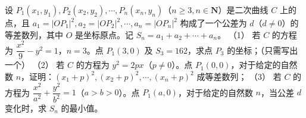 \begin{question}
设 $P_1(x_1, y_1), P_2(x_2, y_2), \cdots, P_n(x_n, y_n)$（$n \geqslant 3, n \in \mathbf{N}$）是二次曲线 $C$ 上的点，且 $a_1 = |OP_1|^2, a_2 = |OP_2|^2, \cdots, a_n = |OP_n|^2$ 构成了一个公差为 $d$（$d \ne 0$）的等差数列，其中 $O$ 是坐标原点。记 $S_n = a_1 + a_2 + \cdots + a_n$。
（1） 若 $C$ 的方程为 $\dfrac{x^2}{9} - y^2 = 1$，$n = 3$。点 $P_1(3, 0)$ 及 $S_3 = 162$，求点 $P_3$ 的坐标；（只需写出一个）
（2） 若 $C$ 的方程为 $y^2 = 2px$（$p \ne 0$）。点 $P_1(0, 0)$，对于给定的自然数 $n$，证明：$(x_1 + p)^2, (x_2 + p)^2, \cdots, (x_n + p)^2$ 成等差数列；
（3） 若 $C$ 的方程为 $\dfrac{x^2}{a^2} + \dfrac{y^2}{b^2} = 1$（$a > b > 0$）。点 $P_1(a, 0)$，对于给定的自然数 $n$，当公差 $d$ 变化时，求 $S_n$ 的最小值。

\end{question}